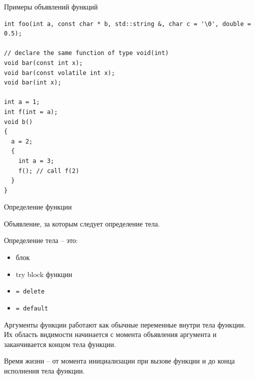 \documentclass[unknownkeysallowed,xcolor=table]{beamer}
\begin{document}
\begin{frame}[fragile]{Примеры объявлений функций}

\begin{lstlisting}
int foo(int a, const char * b, std::string &, char c = '\0', double = 0.5);

// declare the same function of type void(int)
void bar(const int x);
void bar(const volatile int x);
void bar(int x);

int a = 1;
int f(int = a);
void b()
{
  a = 2;
  {
    int a = 3;
    f(); // call f(2)
  }
}
\end{lstlisting}

\end{frame}

\begin{frame}{Определение функции}

Объявление, за которым следует определение тела.

Определение тела -- это:

\begin{itemize}
  \item блок \vspace{0.7em}
  \item try block функции \vspace{0.7em}
  \item \lstinline{= delete} \vspace{0.7em}
  \item \lstinline{= default}
\end{itemize}
\vspace{0.7em}

Аргументы функции работают как обычные переменные внутри тела функции. Их область видимости начинается с момента объявления аргумента и заканчивается концом тела функции.

Время жизни -- от момента инициализации при вызове функции и до конца исполнения тела функции.

\end{frame}
\end{document}
